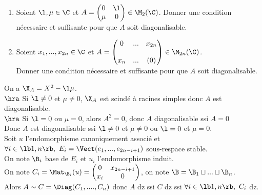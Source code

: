 \documentclass[11pt]{article}
\begin{document}
\begin{exercice}{}{}
    \begin{enumerate}
        \item Soient $\l,\mu \in \C$ et $A=\begin{pmatrix}0&\l\\\mu&0\end{pmatrix}\in\M_2(\C)$.
        Donner une condition nécessaire et suffisante pour que $A$ soit diagonalisable.
        \item Soient $x_1,...,x_{2n}\in\C$ et $A=\begin{pmatrix}0&...&x_{2n}\\&&\\x_n&...&(0)\end{pmatrix}\in\M_{2n}(\C)$.\\
        Donner une condition nécessaire et suffisante pour que $A$ soit diagonalisable.
    \end{enumerate}
    \tcblower
     On a $\X_A = X^2-\l\mu$.\\
    $\hra$ Si $\l\neq0$ et $\mu\neq0$, $\X_A$ est scindé à racines simples donc $A$ est diagonalisable.\\
    $\hra$ Si $\l=0$ ou $\mu=0$, alors $A^2=0$, donc $A$ diagonalisable ssi $A=0$\\
    Donc $A$ est diagonalisable ssi $\l\neq0$ et $\mu\neq0$ ou $\l=0$ et $\mu=0$.\\
     Soit $u$ l'endomorphisme canoniquement associé et $\forall i \in \lb1,n\rb, ~ E_i=\Vect(e_1,...,e_{2n-i+1})$ sous-respace stable.\\
    On note $\B_i$ base de $E_i$ et $u_i$ l'endomorphisme induit.\\
    On note $C_i = \Mat_{\B_i}(u)=\begin{pmatrix}0 & x_{2n-i+1} \\ x_i & 0\end{pmatrix}$, on note $\B=\B_1\sqcup...\sqcup \B_n$.\\
    Alors $A\sim C = \Diag(C_1,....,C_n)$ donc $A$ dz ssi $C$ dz ssi $\forall i \in \lb 1, n \rb, ~ C_i$ dz.
\end{exercice}

\pagebreak
\end{document}

